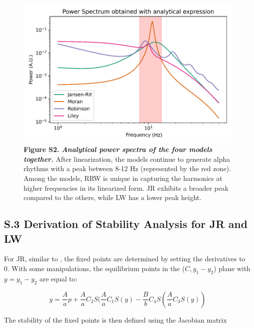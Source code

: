 \documentclass[12pt,twoside]{article}
\begin{document}
\begin{figure}[H]
    \centering
    \includegraphics[scale=1]{Images/Analytical_Power_Spectra.png}
    \caption*{\textbf{Figure S2.  \textit{Analytical power spectra of the four models together.}} After linearization, the models continue to generate alpha rhythms with a peak between 8-12 Hz (represented by the red zone). Among the models, RRW is unique in capturing the harmonics at higher frequencies in its linearized form. JR exhibits a broader peak compared to the others, while LW has a lower peak height.}     
    \label{fig:TF_all_supp} 
\end{figure}

\newpage
\subsection*{S.3 Derivation of Stability Analysis for JR and LW}
For JR, similar to \citet{grimbert2006bifurcation}, the fixed points are determined by setting the derivatives to 0. With some manipulations, the equilibrium points in the ($C, y_1 - y_2$) plane with $y = y_1 - y_2$ are equal to:

\begin{equation}
    y = \frac{A}{a}p + \frac{A}{a}C_2S(\frac{A}{a}C_1S(y) - \frac{B}{b}C_4S(\frac{A}{a}C_3S(y))
\end{equation}

The stability of the fixed points is then defined using the Jacobian matrix
\end{document}
